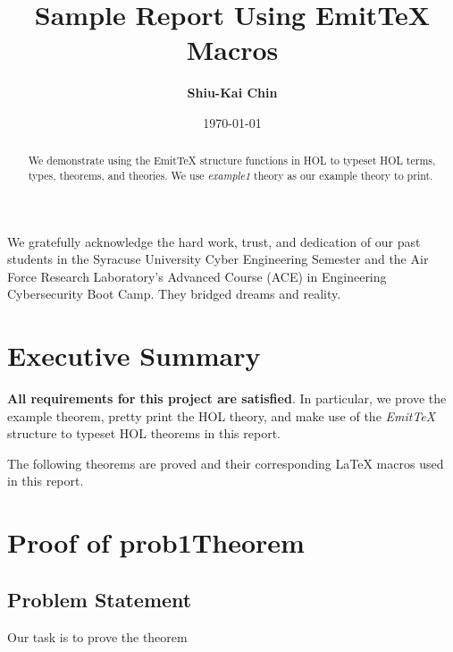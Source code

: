 \documentclass{report}
\title{Sample Report Using EmitTeX Macros}
\author{\textbf{Shiu-Kai Chin}}
\date{\today}
\begin{document}
\lstset{language=ML}


\maketitle{}

\begin{abstract}
  We demonstrate using the EmitTeX structure functions in HOL to
  typeset HOL terms, types, theorems, and theories. We use
  \emph{example1} theory as our example theory to print.
\end{abstract}

\begin{acknowledgments}
  We gratefully acknowledge the hard work, trust, and dedication of
  our past students in the Syracuse University Cyber Engineering
  Semester and the Air Force Research Laboratory's Advanced Course
  (ACE) in Engineering Cybersecurity Boot Camp.  They bridged dreams
  and reality.
\end{acknowledgments}

\tableofcontents{}

\chapter{Executive Summary}
\label{cha:executive-summary}

\textbf{All requirements for this project are satisfied}.  In
particular, we prove the example theorem, pretty print the HOL theory,
and make use of the \emph{EmitTeX} structure to typeset HOL theorems
in this report.

The following theorems are proved and their corresponding \LaTeX{}
macros used in this report.
\begin{quote}
  \HOLexampleOneTheorems
\end{quote}

\chapter{Proof of prob1Theorem}
\label{cha:proof-prob1theorem}

\section{Problem Statement}
\label{sec:problem-statement}

Our task is to prove the theorem \HOLexampleOneTheoremsprobOneTheorem
\end{document}
